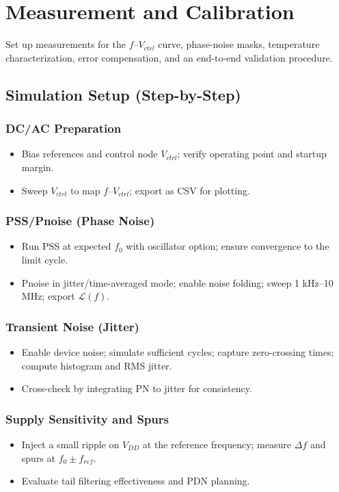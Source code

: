 \chapter{Measurement and Calibration}
Set up measurements for the \(f\)–\(V_{ctrl}\) curve, phase-noise masks, temperature characterization, error compensation, and an end-to-end validation procedure.

\section{Simulation Setup (Step-by-Step)}
\subsection*{DC/AC Preparation}
\begin{itemize}
  \item Bias references and control node $V_{ctrl}$; verify operating point and startup margin.
  \item Sweep $V_{ctrl}$ to map $f$–$V_{ctrl}$; export as CSV for plotting.
\end{itemize}

\subsection*{PSS/Pnoise (Phase Noise)}
\begin{itemize}
  \item Run PSS at expected $f_0$ with oscillator option; ensure convergence to the limit cycle.
  \item Pnoise in jitter/time-averaged mode; enable noise folding; sweep 1 kHz–10 MHz; export $\mathcal{L}(f)$.
\end{itemize}

\subsection*{Transient Noise (Jitter)}
\begin{itemize}
  \item Enable device noise; simulate sufficient cycles; capture zero-crossing times; compute histogram and RMS jitter.
  \item Cross-check by integrating PN to jitter for consistency.
\end{itemize}

\subsection*{Supply Sensitivity and Spurs}
\begin{itemize}
  \item Inject a small ripple on $V_{DD}$ at the reference frequency; measure $\Delta f$ and spurs at $f_0\pm f_{ref}$.
  \item Evaluate tail filtering effectiveness and PDN planning.
\end{itemize}

